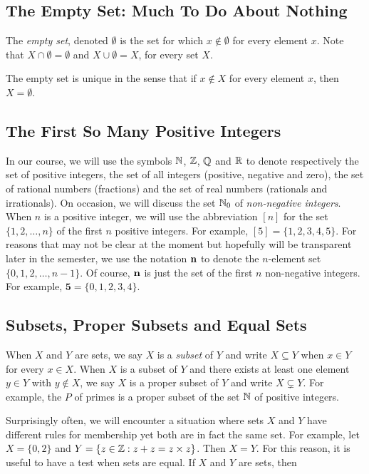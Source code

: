 \subsection{The Empty Set: Much To Do About Nothing}

The \textit{empty set}, denoted $\emptyset$ is the set for
which $x\notin \emptyset$ for every element $x$.  Note that
$X\cap \emptyset =\emptyset$ and $X\cup \emptyset=X$, for every
set $X$. 

The empty set is unique in the sense that if $x\notin X$ for every
element $x$, then $X=\emptyset$.

\subsection{The First So Many Positive Integers}

In our course, we will use the symbols $\mathbb{N}$, $\mathbb{Z}$,
$\mathbb{Q}$ and $\mathbb{R}$ to denote respectively the
set of positive integers, the set of all integers (positive, negative
and zero), the set of rational numbers (fractions) and the set of real
numbers (rationals and irrationals).  On occasion, we will discuss
the set $\mathbb{N}_0$ of \textit{non-negative integers}.
When $n$ is a positive integer, we will use the 
abbreviation $[n]$ for the set $\{1,2,\dots,n\}$ of the
first $n$ positive integers.  For example, $[5]=\{1,2,3,4,5\}$.
For reasons that may not be clear at the moment but hopefully
will be transparent later in the semester, we use the
notation $\mathbf{n}$ to denote the $n$-element set $\{0,1,2,\dots,n-1\}$.
Of course, $\mathbf{n}$ is just the set of the first $n$ non-negative
integers.  For example, $\mathbf{5}=\{0,1,2,3,4\}$.

\subsection{Subsets, Proper Subsets and Equal Sets} 

When $X$ and $Y$ are sets, we say $X$ is a \textit{subset} of $Y$ and
write $X\subseteq Y$ when $x\in Y$ for every $x\in X$.  When $X$ is a
subset of $Y$ and there exists at least one element $y\in Y$ with
$y\notin X$, we say $X$ is a proper subset of $Y$ and write
$X\subsetneq Y$.  For example, the $P$ of primes is a proper subset of
the set $\mathbb{N}$ of positive integers.

Surprisingly often, we will encounter a situation where
sets $X$ and $Y$ have different rules for membership
yet both are in fact the same set.  For example, let
$X=\{0,2\}$ and $Y=\{z\in\mathbb{Z}: z+z=z\times z\}$. Then $X=Y$.
For this reason, it is useful to have a test when sets are
equal.  If $X$ and $Y$ are sets, then

